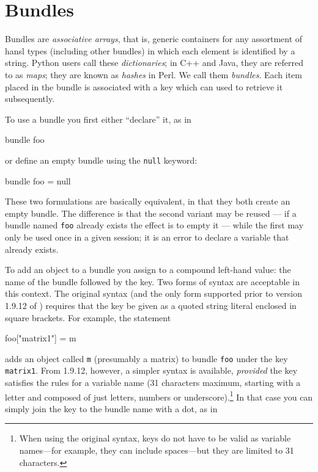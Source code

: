 \chapter{Bundles}

Bundles are \emph{associative arrays}, that is, generic containers for
any assortment of hansl types (including other bundles) in which each
element is identified by a string. Python users call these
\emph{dictionaries}; in C++ and Java, they are referred to as
\emph{maps}; they are known as \emph{hashes} in Perl. We call them
\emph{bundles}. Each item placed in the bundle is associated with a
key which can used to retrieve it subsequently.

To use a bundle you first either ``declare'' it, as in
%
\begin{code}
bundle foo
\end{code}
%
or define an empty bundle using the \texttt{null} keyword:
%
\begin{code}
bundle foo = null
\end{code}
%
These two formulations are basically equivalent, in that they both
create an empty bundle. The difference is that the second variant
may be reused --- if a bundle named \texttt{foo} already exists the
effect is to empty it --- while the first may only be used once in
a given  session; it is an error to declare a variable that
already exists. 

To add an object to a bundle you assign to a compound left-hand value:
the name of the bundle followed by the key. Two forms of syntax are
acceptable in this context. The original syntax (and the only form
supported prior to version 1.9.12 of ) requires that the
key be given as a quoted string literal enclosed in square brackets.
For example, the statement

\begin{code}
foo["matrix1"] = m
\end{code}

adds an object called \texttt{m} (presumably a matrix) to bundle
\texttt{foo} under the key \texttt{matrix1}. From  1.9.12,
however, a simpler syntax is available, \emph{provided} the key
satisfies the rules for a  variable name (31 characters
maximum, starting with a letter and composed of just letters, numbers
or underscore).\footnote{When using the original syntax, keys do not
  have to be valid as variable names---for example, they can include
  spaces---but they are limited to 31 characters.}  In that case you
can simply join the key to the bundle name with a dot, as in

